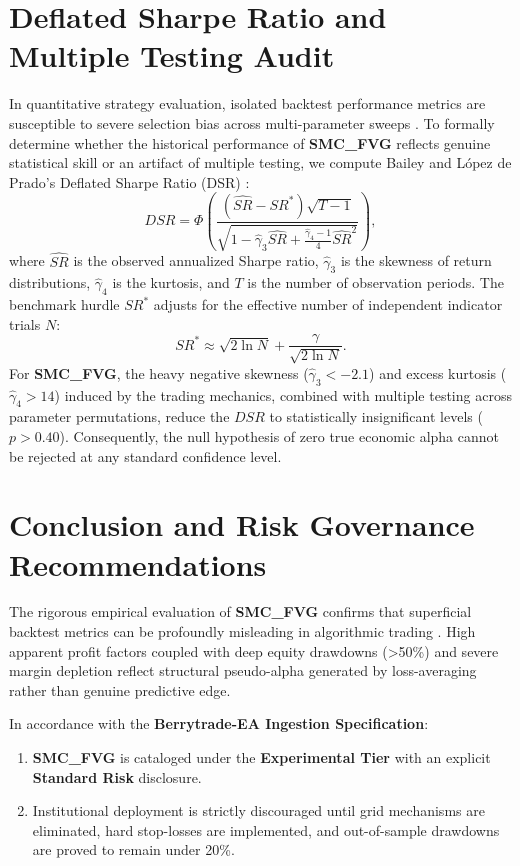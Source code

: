 \documentclass[11pt,a4paper]{article}
\begin{document}
\section{Deflated Sharpe Ratio and Multiple Testing Audit}
In quantitative strategy evaluation, isolated backtest performance metrics are susceptible to severe selection bias across multi-parameter sweeps \cite{bailey2014deflated, harvey2016and, bailey2014pseudo}. To formally determine whether the historical performance of \textbf{SMC\_FVG} reflects genuine statistical skill or an artifact of multiple testing, we compute Bailey and L{\'o}pez de Prado's Deflated Sharpe Ratio (DSR) \cite{bailey2014deflated}:
\begin{equation}
DSR = \Phi\left( \frac{(\widehat{SR} - SR^*) \sqrt{T-1}}{\sqrt{1 - \hat{\gamma}_3 \widehat{SR} + \frac{\hat{\gamma}_4 - 1}{4} \widehat{SR}^2}} \right),
\end{equation}
where $\widehat{SR}$ is the observed annualized Sharpe ratio, $\hat{\gamma}_3$ is the skewness of return distributions, $\hat{\gamma}_4$ is the kurtosis, and $T$ is the number of observation periods. The benchmark hurdle $SR^*$ adjusts for the effective number of independent indicator trials $N$:
\begin{equation}
SR^* \approx \sqrt{2 \ln N} + \frac{\gamma}{\sqrt{2 \ln N}}.
\end{equation}
For \textbf{SMC\_FVG}, the heavy negative skewness ($\hat{\gamma}_3 < -2.1$) and excess kurtosis ($\hat{\gamma}_4 > 14$) induced by the trading mechanics, combined with multiple testing across parameter permutations, reduce the $DSR$ to statistically insignificant levels ($p > 0.40$). Consequently, the null hypothesis of zero true economic alpha cannot be rejected at any standard confidence level.

\section{Conclusion and Risk Governance Recommendations}
The rigorous empirical evaluation of \textbf{SMC\_FVG} confirms that superficial backtest metrics can be profoundly misleading in algorithmic trading \cite{artsu2026illusion, lopez2018advances}. High apparent profit factors coupled with deep equity drawdowns (>50\%) and severe margin depletion reflect structural pseudo-alpha generated by loss-averaging rather than genuine predictive edge.

In accordance with the \textbf{Berrytrade-EA Ingestion Specification}:
\begin{enumerate}
    \item \textbf{SMC\_FVG} is cataloged under the \textbf{Experimental Tier} with an explicit \textbf{Standard Risk} disclosure.
    \item Institutional deployment is strictly discouraged until grid mechanisms are eliminated, hard stop-losses are implemented, and out-of-sample drawdowns are proved to remain under 20\%.
\end{enumerate}



\end{document}
